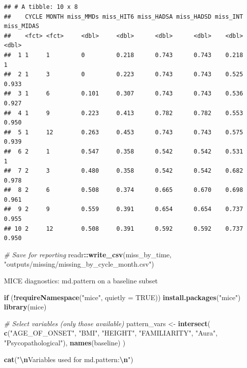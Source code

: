 \documentclass[
]{article}
\newenvironment{Shaded}{\begin{snugshade}}{\end{snugshade}}
\newcommand{\AttributeTok}[1]{\textcolor[rgb]{0.13,0.29,0.53}{#1}}
\newcommand{\CommentTok}[1]{\textcolor[rgb]{0.56,0.35,0.01}{\textit{#1}}}
\newcommand{\ConstantTok}[1]{\textcolor[rgb]{0.56,0.35,0.01}{#1}}
\newcommand{\ControlFlowTok}[1]{\textcolor[rgb]{0.13,0.29,0.53}{\textbf{#1}}}
\newcommand{\FunctionTok}[1]{\textcolor[rgb]{0.13,0.29,0.53}{\textbf{#1}}}
\newcommand{\NormalTok}[1]{#1}
\newcommand{\OtherTok}[1]{\textcolor[rgb]{0.56,0.35,0.01}{#1}}
\newcommand{\SpecialCharTok}[1]{\textcolor[rgb]{0.81,0.36,0.00}{\textbf{#1}}}
\newcommand{\StringTok}[1]{\textcolor[rgb]{0.31,0.60,0.02}{#1}}
\begin{document}
\begin{verbatim}
## # A tibble: 10 x 8
##    CYCLE MONTH miss_MMDs miss_HIT6 miss_HADSA miss_HADSD miss_INT miss_MIDAS
##    <fct> <fct>     <dbl>     <dbl>      <dbl>      <dbl>    <dbl>      <dbl>
##  1 1     1         0         0.218      0.743      0.743    0.218      1    
##  2 1     3         0         0.223      0.743      0.743    0.525      0.933
##  3 1     6         0.101     0.307      0.743      0.743    0.536      0.927
##  4 1     9         0.223     0.413      0.782      0.782    0.553      0.950
##  5 1     12        0.263     0.453      0.743      0.743    0.575      0.939
##  6 2     1         0.547     0.358      0.542      0.542    0.531      1    
##  7 2     3         0.480     0.358      0.542      0.542    0.682      0.978
##  8 2     6         0.508     0.374      0.665      0.670    0.698      0.961
##  9 2     9         0.559     0.391      0.654      0.654    0.737      0.955
## 10 2     12        0.508     0.391      0.592      0.592    0.737      0.950
\end{verbatim}

\begin{Shaded}
\begin{Highlighting}[]
\CommentTok{\# Save for reporting}
\NormalTok{readr}\SpecialCharTok{::}\FunctionTok{write\_csv}\NormalTok{(miss\_by\_time, }\StringTok{"outputs/missing/missing\_by\_cycle\_month.csv"}\NormalTok{)}
\end{Highlighting}
\end{Shaded}

MICE diagnostics: md.pattern on a baseline subset

\begin{Shaded}
\begin{Highlighting}[]
\ControlFlowTok{if}\NormalTok{ (}\SpecialCharTok{!}\FunctionTok{requireNamespace}\NormalTok{(}\StringTok{"mice"}\NormalTok{, }\AttributeTok{quietly =} \ConstantTok{TRUE}\NormalTok{)) }\FunctionTok{install.packages}\NormalTok{(}\StringTok{"mice"}\NormalTok{)}
\FunctionTok{library}\NormalTok{(mice)}

\CommentTok{\# Select variables (only those available)}
\NormalTok{pattern\_vars }\OtherTok{\textless{}{-}} \FunctionTok{intersect}\NormalTok{(}
  \FunctionTok{c}\NormalTok{(}\StringTok{"AGE\_OF\_ONSET"}\NormalTok{, }\StringTok{"BMI"}\NormalTok{, }\StringTok{"HEIGHT"}\NormalTok{, }\StringTok{"FAMILIARITY"}\NormalTok{, }\StringTok{"Aura"}\NormalTok{, }\StringTok{"Psycopathological"}\NormalTok{),}
  \FunctionTok{names}\NormalTok{(baseline)}
\NormalTok{)}

\FunctionTok{cat}\NormalTok{(}\StringTok{"}\SpecialCharTok{\textbackslash{}n}\StringTok{Variables used for md.pattern:}\SpecialCharTok{\textbackslash{}n}\StringTok{"}\NormalTok{)}
\end{Highlighting}
\end{Shaded}
\end{document}

